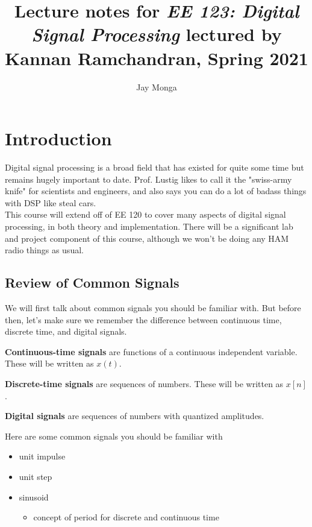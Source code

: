 \documentclass{report}
\begin{document}
\title{Lecture notes for \textit{EE 123: Digital Signal Processing} lectured by Kannan Ramchandran, Spring 2021}
\author{Jay Monga}
\maketitle

\tableofcontents

\chapter{Introduction}
Digital signal processing is a broad field that has existed for quite some time but remains hugely important to date.
Prof. Lustig likes to call it the "swiss-army knife" for scientists and engineers, and also says you can do a lot of badass things with DSP like steal cars. \\
This course will extend off of EE 120 to cover many aspects of digital signal processing, in both theory and implementation.
There will be a significant lab and project component of this course, although we won't be doing any HAM radio things as usual.

\section{Review of Common Signals}
We will first talk about common signals you should be familiar with.
But before then, let's make sure we remember the difference between continuous time, discrete time, and digital signals.
\theoremstyle{definition}
\begin{definition}
    \textbf{Continuous-time signals} are functions of a continuous independent variable. These will be written as $x(t)$.
\end{definition}
\begin{definition}
    \textbf{Discrete-time signals} are sequences of numbers. These will be written as $x[n]$.
\end{definition}
\begin{definition}
    \textbf{Digital signals} are sequences of numbers with quantized amplitudes.
\end{definition}
Here are some common signals you should be familiar with
\begin{itemize}
    \item unit impulse
    \item unit step
    \item sinusoid
    \begin{itemize}
        \item concept of period for discrete and continuous time
    \end{itemize}
\end{itemize}
\end{document}
